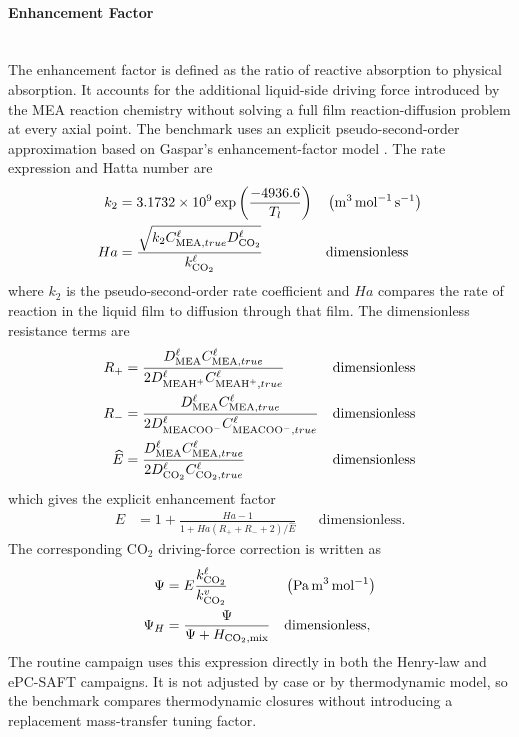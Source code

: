                 \paragraph{Enhancement Factor}\mbox{}\\[0.5em]
                The enhancement factor is defined as the ratio of reactive absorption to physical absorption. It accounts for the additional liquid-side driving force introduced by the MEA reaction chemistry without solving a full film reaction-diffusion problem at every axial point. The benchmark uses an explicit pseudo-second-order approximation based on Gaspar's enhancement-factor model \cite{Gaspar2015}. The rate expression and Hatta number are
                \begin{align}
                    k_2 &= 3.1732 \times 10^{9} \exp\left( \frac{-4936.6}{T_l}\right)
                    && \left(\unit{m^{3}\,mol^{-1}\,s^{-1}}\right)\\
                    Ha &= \frac{\sqrt{k_2 C^{\liq}_{\MEA,true} D^{\liq}_{\COtwo}}}{k^{\liq}_{\COtwo}}
                    && \text{dimensionless}
                \end{align}
                where $k_2$ is the pseudo-second-order rate coefficient and $Ha$ compares the rate of reaction in the liquid film to diffusion through that film. The dimensionless resistance terms are
                \begin{align}
                    R_+ &= \frac{D^{\liq}_{\MEA} C^{\liq}_{\MEA,true}}
                    {2D^{\liq}_{\MEAH} C^{\liq}_{\MEAH,true}}
                    && \text{dimensionless}\\
                    R_- &= \frac{D^{\liq}_{\MEA} C^{\liq}_{\MEA,true}}
                    {2D^{\liq}_{\MEACOO} C^{\liq}_{\MEACOO,true}}
                    && \text{dimensionless}\\
                    \widehat{E} &= \frac{D^{\liq}_{\MEA} C^{\liq}_{\MEA,true}}
                    {2D^{\liq}_{\COtwo} C^{\liq}_{\COtwo,true}}
                    && \text{dimensionless}
                \end{align}
                which gives the explicit enhancement factor
                \begin{align}
                    E &= 1+\frac{Ha-1}{1 + Ha(R_+ + R_- + 2)/\widehat{E}}
                    && \text{dimensionless}.
                \end{align}
                The corresponding CO$_2$ driving-force correction is written as
                \begin{align}
                    \Psi &= E \frac{k^{\liq}_{ \COtwo}}{k^{\vap}_{ \COtwo}}
                    && \left(\unit{Pa\,m^{3}\,mol^{-1}}\right)\\
                    \Psi_H &= \frac{\Psi}{\Psi + H_{\COtwo, \text{mix}}}
                    && \text{dimensionless},
                \end{align}
                The routine campaign uses this expression directly in both the Henry-law and ePC-SAFT campaigns. It is not adjusted by case or by thermodynamic model, so the benchmark compares thermodynamic closures without introducing a replacement mass-transfer tuning factor.

